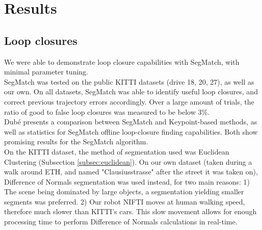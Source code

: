 \section{Results}
\label{sec:segmatch-results}


\subsection{Loop closures}

We were able to demonstrate loop closure capabilities with SegMatch, with minimal parameter tuning.\\

SegMatch was tested on the public KITTI datasets (drive 18, 20, 27), as well as our own. On all datasets, SegMatch was able to identify useful loop closures, and correct previous trajectory errors accordingly. Over a large amount of trials, the ratio of good to false loop closures was measured to be below 3\%.\\

Dubé \cite{segmatch} presents a comparison between SegMatch and Keypoint-based methods, as well as statistics for SegMatch offline loop-closure finding capabilities. Both show promising results for the SegMatch algorithm.\\

On the KITTI dataset, the method of segmentation used was Euclidean Clustering (Subsection \ref{subsec:euclidean}). On our own dataset (taken during a walk around ETH, and named "Clausiusstrasse" after the street it was taken on), Difference of Normals segmentation was used instead, for two main reasons: 1) The scene being dominated by large objects, a segmentation yielding smaller segments was preferred. 2) Our robot NIFTI moves at human walking speed, therefore much slower than KITTI's cars. This slow movement allows for enough processing time to perform Difference of Normals calculations in real-time.\\

